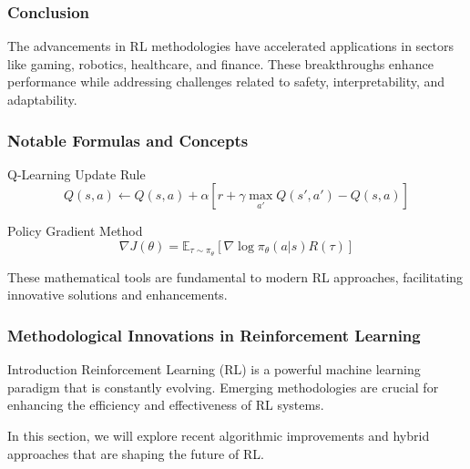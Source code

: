 \documentclass{beamer}
\begin{document}
\begin{frame}[fragile]
    \frametitle{Conclusion}
    The advancements in RL methodologies have accelerated applications in sectors like gaming, robotics, healthcare, and finance. These breakthroughs enhance performance while addressing challenges related to safety, interpretability, and adaptability.
\end{frame}

\begin{frame}[fragile]
    \frametitle{Notable Formulas and Concepts}
    \begin{block}{Q-Learning Update Rule}
    \[
    Q(s, a) \leftarrow Q(s, a) + \alpha \left[ r + \gamma \max_{a'} Q(s', a') - Q(s, a) \right]
    \]
    \end{block}
    
    \begin{block}{Policy Gradient Method}
    \[
    \nabla J(\theta) = \mathbb{E}_{\tau \sim \pi_\theta} \left[ \nabla \log \pi_\theta(a|s) R(\tau) \right]
    \]
    \end{block}
    These mathematical tools are fundamental to modern RL approaches, facilitating innovative solutions and enhancements.
\end{frame}

\begin{frame}[fragile]
    \frametitle{Methodological Innovations in Reinforcement Learning}
    \begin{block}{Introduction}
        Reinforcement Learning (RL) is a powerful machine learning paradigm that is constantly evolving. Emerging methodologies are crucial for enhancing the efficiency and effectiveness of RL systems.
    \end{block}
    In this section, we will explore recent algorithmic improvements and hybrid approaches that are shaping the future of RL.
\end{frame}
\end{document}
